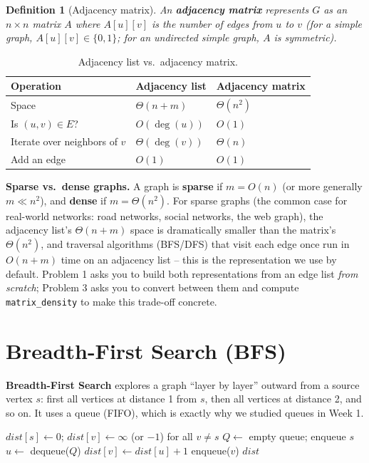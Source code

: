\documentclass[11pt]{article}
\newtheorem{definition}[theorem]{Definition}
\begin{document}
\begin{definition}[Adjacency matrix]
An \textbf{adjacency matrix} represents $G$ as an $n \times n$ matrix $A$ where
$A[u][v]$ is the number of edges from $u$ to $v$ (for a simple graph, $A[u][v] \in
\{0,1\}$; for an undirected simple graph, $A$ is symmetric).
\end{definition}

\begin{table}[h]
\centering
\begin{tabular}{@{}lll@{}}
\toprule
Operation & Adjacency list & Adjacency matrix \\
\midrule
Space & $\Theta(n + m)$ & $\Theta(n^2)$ \\
Is $(u,v) \in E$? & $O(\deg(u))$ & $O(1)$ \\
Iterate over neighbors of $v$ & $\Theta(\deg(v))$ & $\Theta(n)$ \\
Add an edge & $O(1)$ & $O(1)$ \\
\bottomrule
\end{tabular}
\caption{Adjacency list vs.\ adjacency matrix.}
\end{table}

\textbf{Sparse vs.\ dense graphs.} A graph is \textbf{sparse} if $m = O(n)$ (or more
generally $m \ll n^2$), and \textbf{dense} if $m = \Theta(n^2)$. For sparse graphs (the
common case for real-world networks: road networks, social networks, the web graph), the
adjacency list's $\Theta(n+m)$ space is dramatically smaller than the matrix's
$\Theta(n^2)$, and traversal algorithms (BFS/DFS) that visit each edge once run in
$O(n+m)$ time on an adjacency list -- this is the representation we use by default.
Problem 1 asks you to build both representations from an edge list \emph{from scratch};
Problem 3 asks you to convert between them and compute \texttt{matrix\_density} to make
this trade-off concrete.

\section{Breadth-First Search (BFS)}

\textbf{Breadth-First Search} explores a graph ``layer by layer'' outward from a source
vertex $s$: first all vertices at distance 1 from $s$, then all vertices at distance 2,
and so on. It uses a queue (FIFO), which is exactly why we studied queues in Week 1.

\begin{algorithm}[h]
\caption{BFS$(adj, s)$}
\begin{algorithmic}[1]
\State $dist[s] \gets 0$; $dist[v] \gets \infty$ (or $-1$) for all $v \ne s$
\State $Q \gets$ empty queue; enqueue $s$
    \State $u \gets$ dequeue($Q$)
            \State $dist[v] \gets dist[u] + 1$
            \State enqueue($v$)
        \EndIf
    \EndFor
\EndWhile
\State \Return $dist$
\end{algorithmic}
\end{algorithm}
\end{document}
